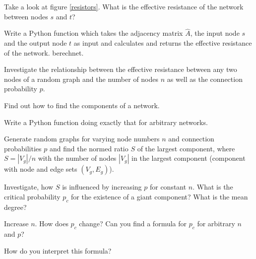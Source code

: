   \exercise[%
  topic = {Effective Resistance}
  ]

 \subexercise[%
  topic={Calculate},
    ]

  Take a look at figure \ref{resistors}. What is the effective
  resistance of the network between nodes $s$ and $t$?

\begin{figure}[h]
\end{figure}


 \subexercise[%
  topic={General Networks of Resistors $R_0$}
    ]

    Write a Python function which takes the adjacency matrix $\hat A$,
    the input node $s$ and the output node $t$ as input and calculates
    and returns the effective resistance of the network.
    berechnet.

    Investigate the relationship between the effective resistance between any
    two nodes of a random graph and the number of nodes $n$ as well as
    the connection probability $p$.



 \exercise[%
     topic={Extra) Percolation of Random Graphs},
    ]
     Find out how to find the components of a network.

     Write a Python function doing exactly that for arbitrary networks.

     Generate random graphs for varying node numbers $n$ and connection
     probabilities $p$ and find the normed ratio $S$ of the largest
     component, where $S=|V_g|/n$ with the number of nodes $|V_g|$ in
     the largest component (component with node and edge sets
     $(V_g,E_g)$).

     Investigate, how $S$ is influenced by increasing $p$ for constant
     $n$. What is the critical probability $p_c$ for the existence of a
     giant component? What is the mean degree?

    
     Increase $n$. How does $p_c$ change? Can you find a formula for
     $p_c$ for arbitrary $n$ and $p$?

     How do you interpret this formula?
	

